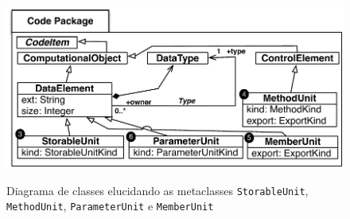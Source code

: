 \begin{figure}[!ht]
	\centering
	\caption{Diagrama de classes elucidando as metaclasses \texttt{StorableUnit}, \texttt{MethodUnit}, \texttt{ParameterUnit} e \texttt{MemberUnit}}
	\includegraphics[scale=0.67]{images/StorableUnit_MethodUnit2}
	\label{fig:StorableUnit_MethodUnit}
\end{figure}






